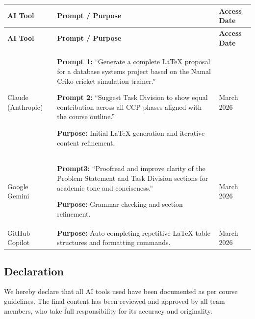\documentclass[12pt,a4paper]{article}
\begin{document}
\begin{longtable}{|p{3cm}|p{8cm}|p{3cm}|}
    \hline
    \textbf{AI Tool} & \textbf{Prompt / Purpose} & \textbf{Access Date} \\
    \hline
    \endfirsthead
    \hline
    \textbf{AI Tool} & \textbf{Prompt / Purpose} & \textbf{Access Date} \\
    \hline
    \endhead

    Claude (Anthropic) &
    \textbf{Prompt 1:} ``Generate a complete LaTeX proposal for a database systems
    project based on the Namal Criko cricket simulation trainer.''

    \textbf{Prompt 2:} ``Suggest Task Division to show equal contribution across
    all CCP phases aligned with the course outline.''

    \textbf{Purpose:} Initial LaTeX generation and iterative content refinement. &
    March 2026 \\
    \hline

    Google Gemini &
    \textbf{Prompt3:} ``Proofread and improve clarity of the Problem Statement and
    Task Division sections for academic tone and conciseness.''

    \textbf{Purpose:} Grammar checking and section refinement. & March 2026 \\
    \hline

    GitHub Copilot &
    \textbf{Purpose:} Auto-completing repetitive LaTeX table structures and
    formatting commands. & March 2026 \\
    \hline

\end{longtable}

\subsection*{Declaration}
We hereby declare that all AI tools used have been documented as per course
guidelines. The final content has been reviewed and approved by all team members,
who take full responsibility for its accuracy and originality.
\end{document}
